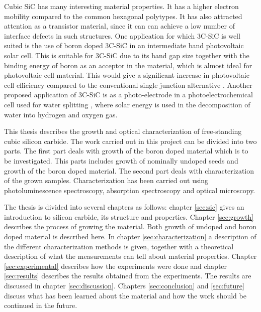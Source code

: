 Cubic SiC has many interesting material properties. It has a higher electron mobility compared to the common hexagonal polytypes. It has also attracted attention as a transistor material, since it can can achieve a low number of interface defects in such structures. One application for which 3C-SiC is well suited is the use of boron doped 3C-SiC in an intermediate band photovoltaic solar cell. This is suitable for 3C-SiC due to its band gap size together with the binding energy of boron as an acceptor in the material, which is almost ideal for photovoltaic cell material. This would give a significant increase in photovoltaic cell efficiency compared to the conventional single junction alternative \cite{Richards2003}. Another proposed application of 3C-SiC is as a photo-electrode in a photoelectrochemical cell used for water splitting \cite{Kato2014,Yasuda2012}, where solar energy is used in the decomposition of water into hydrogen and oxygen gas. 

This thesis describes the growth and optical characterization of free-standing cubic silicon carbide. The work carried out in this project can be divided into two parts. The first part deals with growth of the boron doped material which is to be investigated. This parts includes growth of nominally undoped seeds and growth of the boron doped material. The second part deals with characterization of the grown samples. Characterization has been carried out using photoluminescence spectroscopy, absorption spectroscopy and optical microscopy. 

The thesis is divided into several chapters as follows: chapter \ref{sec:sic} gives an introduction to silicon carbide, its structure and properties. Chapter \ref{sec:growth} describes the process of growing the material. Both growth of undoped and boron doped material is described here. In chapter \ref{sec:characterization} a description of the different characterization methods is given, together with a theoretical description of what the measurements can tell about material properties. Chapter \ref{sec:experimental} describes how the experiments were done and chapter \ref{sec:results} describes the results obtained from the experiments. The results are discussed in chapter \ref{sec:discussion}. Chapters \ref{sec:conclusion} and \ref{sec:future} discuss what has been learned about the material and how the work should be continued in the future. 



































